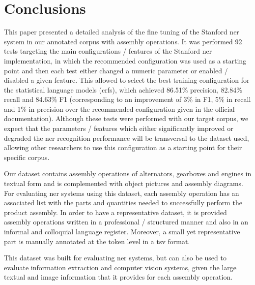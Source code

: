 \section{Conclusions}\label{sec:conclusions}

This paper presented a detailed analysis of the fine tuning of the Stanford \gls{ner} system in our annotated corpus with assembly operations. It was performed 92 tests targeting the main configurations / features of the Stanford \gls{ner} implementation, in which the recommended configuration was used as a starting point and then each test either changed a numeric parameter or enabled / disabled a given feature. This allowed to select the best training configuration for the statistical language models (\glspl{crf}), which achieved 86.51\% precision, 82.84\% recall and 84.63\% F1 (corresponding to an improvement of 3\% in F1, 5\% in recall and 1\% in precision over the recommended configuration given in the official documentation). Although these tests were performed with our target corpus, we expect that the parameters / features which either significantly improved or degraded the \gls{ner} recognition performance will be transversal to the dataset used, allowing other researchers to use this configuration as a starting point for their specific corpus.

Our dataset contains assembly operations of alternators, gearboxes and engines in textual form and is complemented with object pictures and assembly diagrams. For evaluating \gls{ner} systems using this dataset, each assembly operation has an associated list with the parts and quantities needed to successfully perform the product assembly. In order to have a representative dataset, it is provided assembly operations written in a professional / structured manner and also in an informal and colloquial language register. Moreover, a small yet representative part is manually annotated at the token level in a \gls{tsv} format.

This dataset was built for evaluating \gls{ner} systems, but can also be used to evaluate information extraction and computer vision systems, given the large textual and image information that it provides for each assembly operation.

